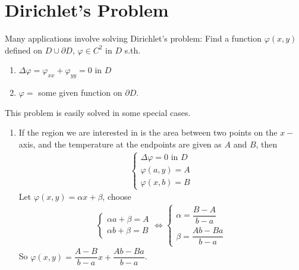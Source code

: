 \documentclass[12pt, a4paper]{article}
\theoremstyle{plain}
\theoremstyle{definition}
\begin{document}
	\section{Dirichlet's Problem} %
	\label{sec:dirichlet_s_problem}
		Many applications involve solving Dirichlet's problem: Find a function $\varphi(x,y)$ defined on $D\cup\partial D$, $\varphi\in C^2$ in $D$ s.th.
		\begin{enumerate}
			\item $\Delta \varphi = \varphi_{xx}+\varphi_{yy} = 0$ in $D$
			\item $\varphi =$ some given function on $\partial D$.
		\end{enumerate}
		This problem is easily solved in some special cases.
			\begin{enumerate}
				\item 
					If the region we are interested in is the area between two points on the $x-$axis, and the temperature at the endpoints are given as $A$ and $B$, then 
					\begin{align*}
						\begin{cases}
							\Delta \varphi = 0 \text{ in } D\\
							\varphi(a,y) = A\\
							\varphi(x,b) = B
						\end{cases}
					\end{align*}
					Let $\varphi(x,y) = \alpha x+\beta$, choose 
					\begin{align*}
						\begin{cases}
							\alpha a + \beta = A\\
							\alpha b + \beta = B
						\end{cases}\iff
						\begin{cases}
							\alpha = \dfrac{B-A}{b-a}\\[0.3cm]
							\beta = \dfrac{Ab-Ba}{b-a}
						\end{cases}
					\end{align*}
					So $\varphi(x,y) = \dfrac{A-B}{b-a}x + \dfrac{Ab-Ba}{b-a}$.


\end{enumerate}
\end{document}
